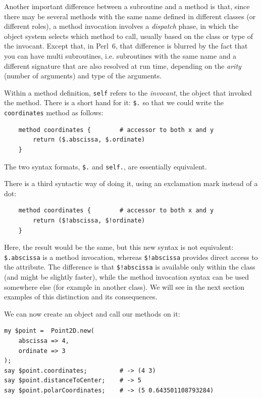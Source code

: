 Another important difference between a subroutine and a method 
is that, since there may be several methods with the same name 
defined in different classes (or different roles), a method 
invocation involves a \emph{dispatch} phase, in 
which the object system selects which method to call, usually 
based on the class or type of the invocant. Except that, in 
Perl~6, that difference is blurred by the fact that you can 
have multi subroutines, i.e. subroutines with the same name 
and a different signature that are also resolved at run time, 
depending on the \emph{arity} (number of arguments) and type of 
the arguments. 


Within a method definition, {\tt self} refers to the 
\emph{invocant}, the object that invoked the method. 
There is a short hand for it: \verb'$.' so that we could 
write the {\tt coordinates} method as follows:

\begin{verbatim}
    method coordinates {        # accessor to both x and y
        return ($.abscissa, $.ordinate)
    }
\end{verbatim}

The two syntax formats, \verb'$.' and {\tt self.}, are 
essentially equivalent.

There is a third syntactic way of doing it, using an 
exclamation mark instead of a dot:

\begin{verbatim}
    method coordinates {        # accessor to both x and y
        return ($!abscissa, $!ordinate)
    }
\end{verbatim}

Here, the result would be the same, but this new syntax is 
not equivalent: \verb'$.abscissa' is a method invocation, 
whereas \verb'$!abscissa' provides direct access to the attribute.
The difference is that \verb'$!abscissa' is available only 
within the class (and might be slightly faster), while 
the method invocation syntax can be used somewhere else 
(for example in another class). We will see in the next section 
examples of this distinction and its consequences.

We can now create an object and call our methods on it:

\begin{verbatim}
my $point =  Point2D.new(
    abscissa => 4, 
    ordinate => 3
);
say $point.coordinates;         # -> (4 3)
say $point.distanceToCenter;    # -> 5
say $point.polarCoordinates;    # -> (5 0.643501108793284)
\end{verbatim}

